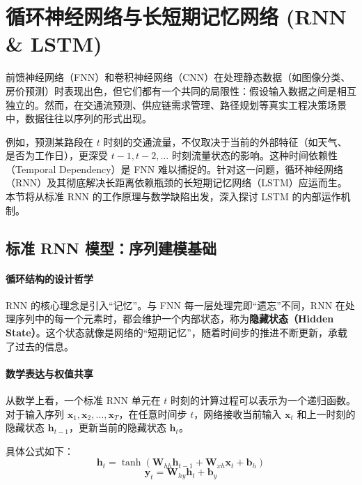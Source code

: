 \section{循环神经网络与长短期记忆网络 (RNN \& LSTM)}
\label{sec:rnn_lstm}

前馈神经网络（FNN）和卷积神经网络（CNN）在处理静态数据（如图像分类、房价预测）时表现出色，但它们都有一个共同的局限性：假设输入数据之间是相互独立的。然而，在交通流预测、供应链需求管理、路径规划等真实工程决策场景中，数据往往以序列的形式出现。

例如，预测某路段在 $t$ 时刻的交通流量，不仅取决于当前的外部特征（如天气、是否为工作日），更深受 $t-1, t-2, \dots$ 时刻流量状态的影响。这种时间依赖性（Temporal Dependency）是 FNN 难以捕捉的。针对这一问题，循环神经网络（RNN）及其彻底解决长距离依赖瓶颈的长短期记忆网络（LSTM）应运而生。本节将从标准 RNN 的工作原理与数学缺陷出发，深入探讨 LSTM 的内部运作机制。

\subsection{标准 RNN 模型：序列建模基础}

\paragraph{循环结构的设计哲学}
RNN 的核心理念是引入“记忆”。与 FNN 每一层处理完即“遗忘”不同，RNN 在处理序列中的每一个元素时，都会维护一个内部状态，称为\textbf{隐藏状态（Hidden State）}。这个状态就像是网络的“短期记忆”，随着时间步的推进不断更新，承载了过去的信息。

\paragraph{数学表达与权值共享}
从数学上看，一个标准 RNN 单元在 $t$ 时刻的计算过程可以表示为一个递归函数。对于输入序列 $\mathbf{x}_1, \mathbf{x}_2, \dots, \mathbf{x}_T$，在任意时间步 $t$，网络接收当前输入 $\mathbf{x}_t$ 和上一时刻的隐藏状态 $\mathbf{h}_{t-1}$，更新当前的隐藏状态 $\mathbf{h}_t$。

具体公式如下：
\begin{equation}
    \mathbf{h}_t = \tanh(\mathbf{W}_{hh} \mathbf{h}_{t-1} + \mathbf{W}_{xh} \mathbf{x}_t + \mathbf{b}_h)
\end{equation}
\begin{equation}
    \mathbf{y}_t = \mathbf{W}_{hy} \mathbf{h}_t + \mathbf{b}_y
\end{equation}

